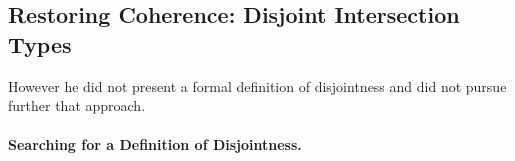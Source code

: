 \subsection{Restoring Coherence: Disjoint Intersection Types}\label{sec:restoring}

However he did not present a formal definition of disjointness and did
not pursue further that approach. 

\paragraph{Searching for a Definition of Disjointness.}
 


